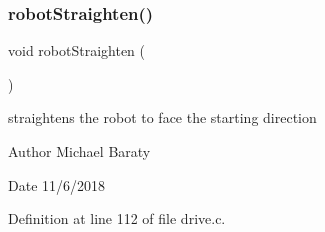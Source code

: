 \mbox{\label{drive_8h_a53fb069f33735f517bdff54c69b8e860}} 
\subsubsection{robot\+Straighten()}
{\footnotesize\ttfamily void robot\+Straighten (\begin{DoxyParamCaption}{ }\end{DoxyParamCaption})}



straightens the robot to face the starting direction 

\begin{DoxyAuthor}{Author}
Michael Baraty 
\end{DoxyAuthor}
\begin{DoxyDate}{Date}
11/6/2018 
\end{DoxyDate}


Definition at line 112 of file drive.\+c.

